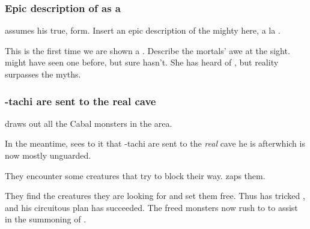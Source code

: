 \subsubsection{Epic description of \Ishnaruchaefir{} as a \dragon}
\Ishnaruchaefir{} assumes his true, \draconian{} form. Insert an epic description of the mighty \dragon{} here, a la . 

This is the first time we are shown a \dragon. 
Describe the mortals' awe at the sight. 
\Dzasselid{} might have seen one before, but \Shilred{} sure hasn't. 
She has heard  of \dragons{}, but reality surpasses the myths. 





\subsubsection{\Dzasselid-tachi are sent to the real cave}
\Ishnaruchaefir{} draws out all the Cabal monsters in the area. 

In the meantime, \Criseis{} sees to it that \Dzasselid-tachi are sent to the \emph{real} cave he is after\dash which is now mostly unguarded. 

They encounter some creatures that try to block their way. 
\Criseis{} zaps them.


They find the creatures they are looking for and set them free. Thus \Ishnaruchaefir{} has tricked \Teshrial{}, and his circuitous plan has succeeded. The freed monsters now rush to \Malcur to assist in the summoning of \Nithdornazsh. 

